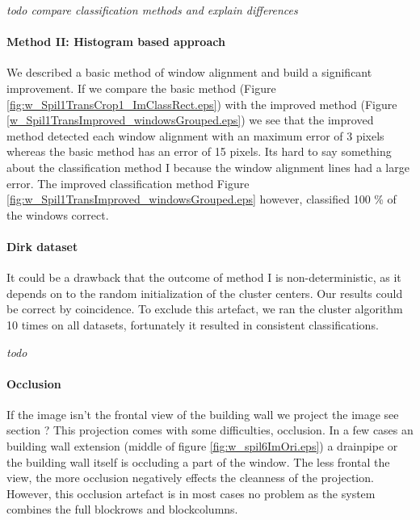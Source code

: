 \emph{todo compare classification methods and explain differences}


\paragraph{Method II: Histogram based approach} 
We described a basic method of window alignment and build a significant improvement.
If we compare the basic method (Figure \ref{fig:w_Spil1TransCrop1_ImClassRect.eps})
with the improved method (Figure \ref{w_Spil1TransImproved_windowsGrouped.eps}) we see that the improved method detected each window alignment with an maximum error of 3 pixels whereas the basic method has an error of 15 pixels.
Its hard to say something about the classification method I because the window alignment lines had a large error.
The improved classification method Figure \ref{fig:w_Spil1TransImproved_windowsGrouped.eps} however, classified 100 \% of the windows correct.


\paragraph{Dirk dataset}


It could be a drawback that the outcome of method I is non-deterministic, as it depends on to the
random initialization of the cluster centers. Our results could be correct by
coincidence.  To exclude this artefact, we ran the cluster algorithm 10 times on all datasets, fortunately it resulted in consistent classifications.

\emph{todo}\\

\paragraph{Occlusion}
\label{lab:occlusion}
If the image isn't the frontal view of the building wall we project the image 
see section ?%
This projection comes with some difficulties, occlusion.  In a few cases an
building wall extension (middle of figure \ref{fig:w_spil6ImOri.eps}) a drainpipe
or the building wall itself is occluding a part of the window.  The less frontal
the view, the more occlusion negatively effects the cleanness of the projection.
However, this occlusion artefact is in most cases no problem as the system
combines the full blockrows and blockcolumns.  

